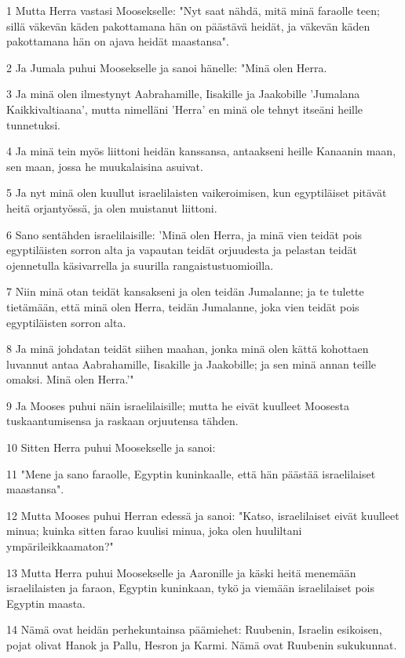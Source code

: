 \par 1 Mutta Herra vastasi Moosekselle: "Nyt saat nähdä, mitä minä faraolle teen; sillä väkevän käden pakottamana hän on päästävä heidät, ja väkevän käden pakottamana hän on ajava heidät maastansa".
\par 2 Ja Jumala puhui Moosekselle ja sanoi hänelle: "Minä olen Herra.
\par 3 Ja minä olen ilmestynyt Aabrahamille, Iisakille ja Jaakobille 'Jumalana Kaikkivaltiaana', mutta nimelläni 'Herra' en minä ole tehnyt itseäni heille tunnetuksi.
\par 4 Ja minä tein myös liittoni heidän kanssansa, antaakseni heille Kanaanin maan, sen maan, jossa he muukalaisina asuivat.
\par 5 Ja nyt minä olen kuullut israelilaisten vaikeroimisen, kun egyptiläiset pitävät heitä orjantyössä, ja olen muistanut liittoni.
\par 6 Sano sentähden israelilaisille: 'Minä olen Herra, ja minä vien teidät pois egyptiläisten sorron alta ja vapautan teidät orjuudesta ja pelastan teidät ojennetulla käsivarrella ja suurilla rangaistustuomioilla.
\par 7 Niin minä otan teidät kansakseni ja olen teidän Jumalanne; ja te tulette tietämään, että minä olen Herra, teidän Jumalanne, joka vien teidät pois egyptiläisten sorron alta.
\par 8 Ja minä johdatan teidät siihen maahan, jonka minä olen kättä kohottaen luvannut antaa Aabrahamille, Iisakille ja Jaakobille; ja sen minä annan teille omaksi. Minä olen Herra.'"
\par 9 Ja Mooses puhui näin israelilaisille; mutta he eivät kuulleet Moosesta tuskaantumisensa ja raskaan orjuutensa tähden.
\par 10 Sitten Herra puhui Moosekselle ja sanoi:
\par 11 "Mene ja sano faraolle, Egyptin kuninkaalle, että hän päästää israelilaiset maastansa".
\par 12 Mutta Mooses puhui Herran edessä ja sanoi: "Katso, israelilaiset eivät kuulleet minua; kuinka sitten farao kuulisi minua, joka olen huuliltani ympärileikkaamaton?"
\par 13 Mutta Herra puhui Moosekselle ja Aaronille ja käski heitä menemään israelilaisten ja faraon, Egyptin kuninkaan, tykö ja viemään israelilaiset pois Egyptin maasta.
\par 14 Nämä ovat heidän perhekuntainsa päämiehet: Ruubenin, Israelin esikoisen, pojat olivat Hanok ja Pallu, Hesron ja Karmi. Nämä ovat Ruubenin sukukunnat.
